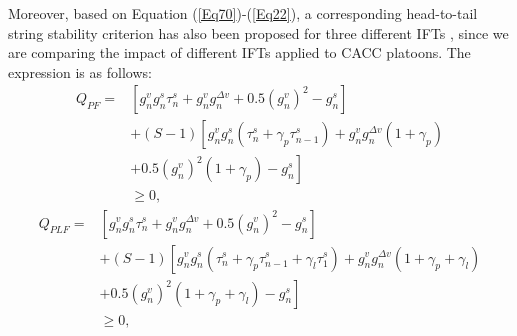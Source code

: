 \documentclass[journal]{IEEEtran}
\begin{document}
Moreover, based on Equation (\ref{Eq70})-(\ref{Eq22}), a corresponding head-to-tail string stability criterion has also been proposed for three different IFTs \citep{ngoduy2013analytical,2009Heterogeneity}, since we are comparing the impact of different IFTs applied to CACC platoons. The expression is as follows:
\begin{equation}
  \begin{aligned}
    Q_{PF}= & \left[ g_{n}^{v} g_{n}^{s} \tau_{n}^{s} \!+\!g_{n}^{v} g_{n}^{\Delta v}+0.5\left(g_{n}^{v}\right)^{2}\!-\!g_{n}^{s} \right]                                                      \\
            & +\left(S\!-\!1\right) \left[g_{n}^{v} g_{n}^{s}\left(\tau_{n}^{s}\!+\!\gamma_{p} \tau_{n\!-\!1}^{s}\right)\!+\!g_{n}^{v} g_{n}^{\Delta v}\left(1\!+\!\gamma_{p}\right)\! \right. \\
            & \left. +0.5\left(g_{n}^{v}\right)^{2}\left(1\!+\!\gamma_{p}\right)\!-\!g_{n}^{s}\right]                                                                                          \\
            & \geq 0,
  \end{aligned}
  \label{Eq71}
\end{equation}
\begin{equation}
  \begin{aligned}
    Q_{PLF}= & \left[ g_{n}^{v} g_{n}^{s} \tau_{n}^{s} \!+\!g_{n}^{v} g_{n}^{\Delta v}+0.5\left(g_{n}^{v}\right)^{2}\!-\!g_{n}^{s} \right]                                                                                              \\
             & +\left(S\!-\!1\right)\left[g_{n}^{v} g_{n}^{s}\left(\tau_{n}^{s}\!+\!\gamma_{p} \tau_{n\!-\!1}^{s}\!+\!\gamma_{l} \tau_{1}^{s}\right)\!+\!g_{n}^{v} g_{n}^{\Delta v}\left(1\!+\!\gamma_{p}\!+\!\gamma_{l}\right) \right. \\
             & \left.+0.5\left(g_{n}^{v}\right)^{2}\left(1\!+\!\gamma_{p}\!+\!\gamma_{l}\right)\!-\!g_{n}^{s} \right]                                                                                                                   \\
             & \geq 0,
  \end{aligned}
  \label{Eq72}
\end{equation}
\end{document}
